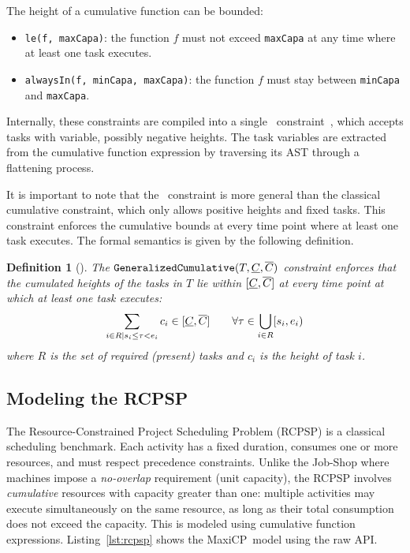 \documentclass[11pt, a4paper]{scrartcl}
\newtheorem{definition}{Definition}
\newcommand{\maxicp}{\textsf{MaxiCP}}
\begin{document}
The height of a cumulative function can be bounded:
\begin{itemize}
    \item \texttt{le(f, maxCapa)}: the function $f$ must not exceed \texttt{maxCapa} at any time where at least one task executes.
    \item \texttt{alwaysIn(f, minCapa, maxCapa)}: the function $f$ must stay between \texttt{minCapa} and \texttt{maxCapa}.
\end{itemize}

Internally, these constraints are compiled into a single \gcumulative\ constraint~\cite{Schaus2025GeneralizedCumulative},
which accepts tasks with variable, possibly negative heights.
The task variables are extracted from the cumulative function expression by traversing its AST through a flattening process.

It is important to note that the \gcumulative\ constraint is more general than the classical cumulative constraint, which only allows positive heights and fixed tasks.
This constraint enforces the cumulative bounds at every time point where at least one task executes.
The formal semantics is given by the following definition.
\begin{definition}[\gcumulative]
The $\texttt{GeneralizedCumulative}(T, \underline{C}, \overline{C})$ constraint enforces that the cumulated heights of the tasks in $T$ lie within $[\underline{C}, \overline{C}]$ at every time point at which at least one task executes:
\[
    \sum_{i \in R \mid s_i \leq \tau < e_i} c_i \in [\underline{C}, \overline{C}] \qquad \forall \tau \in \bigcup_{i \in R} [s_i, e_i)
\]
where $R$ is the set of required (present) tasks and $c_i$ is the height of task $i$.
\end{definition}


\subsection{Modeling the RCPSP}

The Resource-Constrained Project Scheduling Problem (RCPSP) is a classical scheduling benchmark. Each activity has a fixed duration, consumes one or more resources, and must respect precedence constraints.
Unlike the Job-Shop where machines impose a \emph{no-overlap} requirement (unit capacity), the RCPSP involves \emph{cumulative} resources with capacity greater than one: multiple activities may execute simultaneously on the same resource, as long as their total consumption does not exceed the capacity.
This is modeled using cumulative function expressions. Listing~\ref{lst:rcpsp} shows the \maxicp\ model using the raw API.
\end{document}
